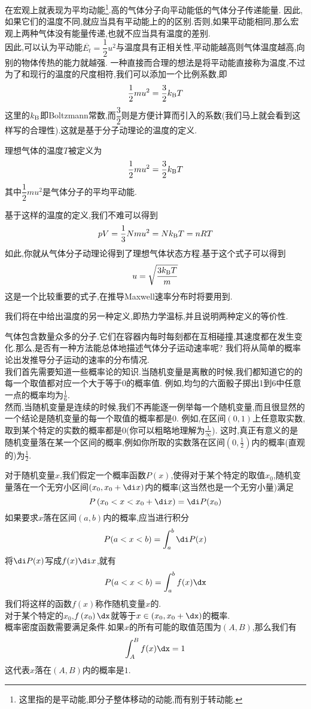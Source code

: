 \documentclass{ctexart}
\begin{document}
在宏观上就表现为平均动能\footnote{这里指的是平动能,即分子整体移动的动能,而有别于转动能.}.高的气体分子向平动能低的气体分子传递能量.%
因此,如果它们的温度不同,就应当具有平动能上的的区别.否则,如果平动能相同,那么宏观上两种气体没有能量传递,也就不应当具有温度的差别.\\
\indent 因此,可以认为平动能$\overline{E_t}=\dfrac12u^2$与温度具有正相关性,平动能越高则气体温度越高,向别的物体传热的能力就越强.%
一种直接而合理的想法是将平动能直接称为温度,不过为了和现行的温度的尺度相符,我们可以添加一个比例系数,即
\[\dfrac12mu^2=\dfrac{3}{2}k_\text BT\]
这里的$k_\text B$即Boltzmann常数,而$\dfrac32$则是方便计算而引入的系数(我们马上就会看到这样写的合理性).这就是基于分子动理论的温度的定义.
\begin{definition}[1B.1.4 理想气体温标]
    理想气体的温度$T$被定义为
    \[\dfrac12mu^2=\dfrac32k_\text BT\]
    其中$\dfrac12mu^2$是气体分子的平均平动能.
\end{definition}
基于这样的温度的定义,我们不难可以得到
\[pV=\dfrac13Nmu^2=Nk_\text BT=nRT\]
如此,你就从气体分子动理论得到了理想气体状态方程.基于这个式子可以得到
\[u=\sqrt{\dfrac{3k_\text BT}{m}}\]
这是一个比较重要的式子,在推导Maxwell速率分布时将要用到.
\begin{hint}
    我们将在中给出温度的另一种定义,即热力学温标,并且说明两种定义的等价性.
\end{hint}\vspace{8pt}
\indent 气体包含数量众多的分子.它们在容器内每时每刻都在互相碰撞,其速度都在发生变化.那么,是否有一种方法能总体地描述气体分子运动速率呢?%
我们将从简单的概率论出发推导分子运动的速率的分布情况.\\
\indent 我们首先需要知道一些概率论的知识.当随机变量是离散的时候,我们都知道它的的每一个取值都对应一个大于等于0的概率值.%
例如,均匀的六面骰子掷出1到6中任意一点的概率均为$\frac16$.\\
\indent 然而,当随机变量是连续的时候,我们不再能逐一例举每一个随机变量,而且很显然的一个结论是随机变量的每一个取值的概率都是0.%
例如,在区间$(0,1)$上任意取实数,取到某个特定的实数的概率都是$0$(你可以粗略地理解为$\frac{1}{\infty}$).%
这时,真正有意义的是随机变量落在某一个区间的概率,例如你所取的实数落在区间$\left(0,\frac12\right)$内的概率(直观的)为$\frac12$.
\begin{definition}[1B.2.1 连续随机变量的概率密度函数]
    对于随机变量$x$,我们假定一个概率函数$P(x)$,使得对于某个特定的取值$x_0$,随机变量落在一个无穷小区间$(x_0,x_0+\di x)$内的概率(这当然也是一个无穷小量)满足
    \[P\left(x_0<x<x_0+\di x\right)=\di P(x_0)\]
    如果要求$x$落在区间$(a,b)$内的概率,应当进行积分
    \[P(a<x<b)=\int_a^b\di P(x)\]
    将$\di P(x)$写成$f(x)\di x$,就有
    \[P(a<x<b)=\int_a^bf(x)\dx\]
    我们将这样的函数$f(x)$称作随机变量$x$的.\\
    对于某个特定的$x_0$,$f\left(x_0\right)\dx$就等于$x\in\left(x_0,x_0+\dx\right)$的概率.\\
    概率密度函数需要满足条件.如果$x$的所有可能的取值范围为$(A,B)$,那么我们有
    \[\int_A^Bf(x)\dx=1\]
    这代表$x$落在$(A,B)$内的概率是$1$.
\end{definition}
\end{document}
